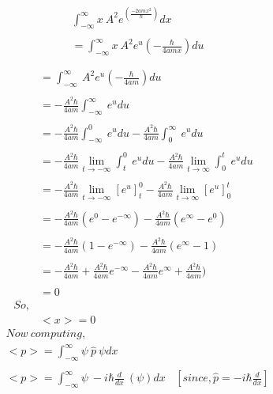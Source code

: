 \documentclass{article}
\begin{document}
\begin{homeworkProblem}
\begin{align*}
   &\int_{-\infty}^{\infty}x\ A^{2} e^{(\frac{-2amx^{2}}{\hbar})} dx \\\\
   &=\int_{-\infty}^{\infty}x\ A^{2} e^{u} (-\frac{\hbar}{4amx}) du \\\\
\end{align*}
\newpage\vspace{5mm}
\hspace{20mm}
\large
\begin{align*}   
   &=\int_{-\infty}^{\infty}\ A^{2} e^{u} (-\frac{\hbar}{4am}) du \\\\
   &=-\frac{A^{2}\hbar}{4am}\int_{-\infty}^{\infty}\  e^{u} du\\\\
   &=-\frac{A^{2}\hbar}{4am}\int_{-\infty}^{0}\  e^{u} du -\frac{A^{2}\hbar}{4am}\int_{0}^{\infty}\  e^{u} du\\\\
   &=-\frac{A^{2}\hbar}{4am}\lim_{t\to-\infty} \int_{t}^{0}\  e^{u} du -\frac{A^{2}\hbar}{4am}\lim_{t\to\infty} \int_{0}^{t}\  e^{u} du\\\\
   &=-\frac{A^{2}\hbar}{4am}\lim_{t\to-\infty} [ e^{u} ]_{t}^{0} -\frac{A^{2}\hbar}{4am}\lim_{t\to\infty} [  e^{u}]_{0}^{t}\\\\
   &=-\frac{A^{2}\hbar}{4am}( e^{0} - e^{-\infty} ) -\frac{A^{2}\hbar}{4am}( e^{\infty} - e^{0} )\\\\
   &=-\frac{A^{2}\hbar}{4am}( 1 - e^{-\infty} ) -\frac{A^{2}\hbar}{4am}( e^{\infty} -1 )\\\\
   &=-\frac{A^{2}\hbar}{4am}+ \frac{A^{2}\hbar}{4am} e^{-\infty}  -\frac{A^{2}\hbar}{4am} e^{\infty} +\frac{A^{2}\hbar}{4am} )\\\\
   &= 0\\
   So,\\
   &<x>=0
\end{align*}
\newpage\vspace{5mm}
\hspace{20mm}
\large
\begin{align*}
  &Now\ computing,\\
  &<p> =\int_{-\infty}^{\infty}\psi \ \hat{p}\ \psi dx\\\\
   &<p> =\int_{-\infty}^{\infty}\psi \ -i\hbar\frac{d}{dx}\ (\psi) dx \ \ \ \ [since,\hat{p} =-i\hbar\frac{d}{dx}] \\\\

\end{align*}
\end{homeworkProblem}
\end{document}
